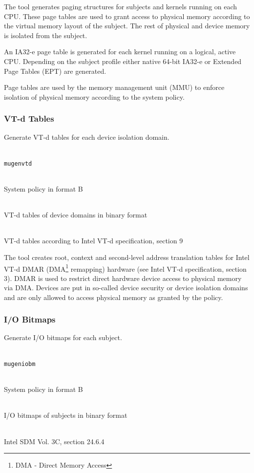 \documentclass[a4paper,twoside,titlepage]{article}
\begin{document}
The tool generates paging structures for subjects and kernels running on each
CPU. These page tables are used to grant access to physical memory according to
the virtual memory layout of the subject. The rest of physical and device
memory is isolated from the subject.

An IA32-e page table is generated for each kernel running on a logical, active
CPU. Depending on the subject profile either native 64-bit IA32-e or Extended
Page Tables (EPT) are generated.

Page tables are used by the memory management unit (MMU) to enforce isolation
of physical memory according to the system policy.

\subsubsection{VT-d Tables}
Generate VT-d tables for each device isolation domain.

\begin{description} \itemsep1pt \parskip0pt
	\item[Name] \hfill \\
		\texttt{mugenvtd}
	\item[Input] \hfill \\
		System policy in format B
	\item[Output] \hfill \\
		VT-d tables of device domains in binary format
	\item[Output format] \hfill \\
		VT-d tables according to Intel VT-d specification, section 9
\end{description}

The tool creates root, context and second-level address translation tables for
Intel VT-d DMAR (DMA\footnote{DMA - Direct Memory Access} remapping) hardware
(see Intel VT-d specification, section 3). DMAR is used to restrict direct
hardware device access to physical memory via DMA. Devices are put in so-called
device security or device isolation domains and are only allowed to access
physical memory as granted by the policy.

\subsubsection{I/O Bitmaps}
Generate I/O bitmaps for each subject.

\begin{description} \itemsep1pt \parskip0pt
	\item[Name] \hfill \\
		\texttt{mugeniobm}
	\item[Input] \hfill \\
		System policy in format B
	\item[Output] \hfill \\
		I/O bitmaps of subjects in binary format
	\item[Output format] \hfill \\
		Intel SDM Vol. 3C, section 24.6.4
\end{description}
\end{document}
